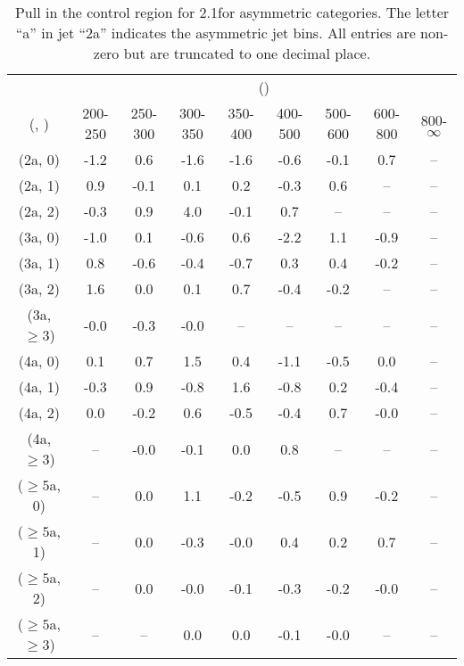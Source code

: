 \begin{table}[h!]
\tiny
\centering
\caption{Pull in the \mmj control region for 2.1\ifb for asymmetric categories. The letter ``a'' in jet \eg ``2a''  indicates the asymmetric jet bins. All entries are non-zero but are truncated to one decimal place.\label{tab:pullsepnaive_mumu_ewk_asym}}
\begin{tabular}
{ccccccccc}
	\hline\hline
	& \multicolumn{8}{c}{\scalht (\gev)} \\ 
	 (\njet,  \nb) & 200-250 & 250-300 & 300-350 & 350-400 & 400-500 & 500-600 & 600-800 & 800-$\infty$ \\ [0.8ex] 
\hline
	(2a, 0) & -1.2 & 0.6 & -1.6 & -1.6 & -0.6 & -0.1 & 0.7 & -- \\[0.5ex] 
	(2a, 1) & 0.9 & -0.1 & 0.1 & 0.2 & -0.3 & 0.6 & -- & -- \\[0.5ex] 
	(2a, 2) & -0.3 & 0.9 & 4.0 & -0.1 & 0.7 & -- & -- & -- \\[0.5ex] 
	(3a, 0) & -1.0 & 0.1 & -0.6 & 0.6 & -2.2 & 1.1 & -0.9 & -- \\[0.5ex] 
	(3a, 1) & 0.8 & -0.6 & -0.4 & -0.7 & 0.3 & 0.4 & -0.2 & -- \\[0.5ex] 
	(3a, 2) & 1.6 & 0.0 & 0.1 & 0.7 & -0.4 & -0.2 & -- & -- \\[0.5ex] 
	(3a, $\ge3$) & -0.0 & -0.3 & -0.0 & -- & -- & -- & -- & -- \\[0.5ex] 
	(4a, 0) & 0.1 & 0.7 & 1.5 & 0.4 & -1.1 & -0.5 & 0.0 & -- \\[0.5ex] 
	(4a, 1) & -0.3 & 0.9 & -0.8 & 1.6 & -0.8 & 0.2 & -0.4 & -- \\[0.5ex] 
	(4a, 2) & 0.0 & -0.2 & 0.6 & -0.5 & -0.4 & 0.7 & -0.0 & -- \\[0.5ex] 
	(4a, $\ge3$) & -- & -0.0 & -0.1 & 0.0 & 0.8 & -- & -- & -- \\[0.5ex] 
	($\ge5$a, 0) & -- & 0.0 & 1.1 & -0.2 & -0.5 & 0.9 & -0.2 & -- \\[0.5ex] 
	($\ge5$a, 1) & -- & 0.0 & -0.3 & -0.0 & 0.4 & 0.2 & 0.7 & -- \\[0.5ex] 
	($\ge5$a, 2) & -- & 0.0 & -0.0 & -0.1 & -0.3 & -0.2 & -0.0 & -- \\[0.5ex] 
	($\ge5$a, $\ge3$) & -- & -- & 0.0 & 0.0 & -0.1 & -0.0 & -- & -- \\[0.5ex] 
	\hline
	\hline
\end{tabular}
\end{table}
